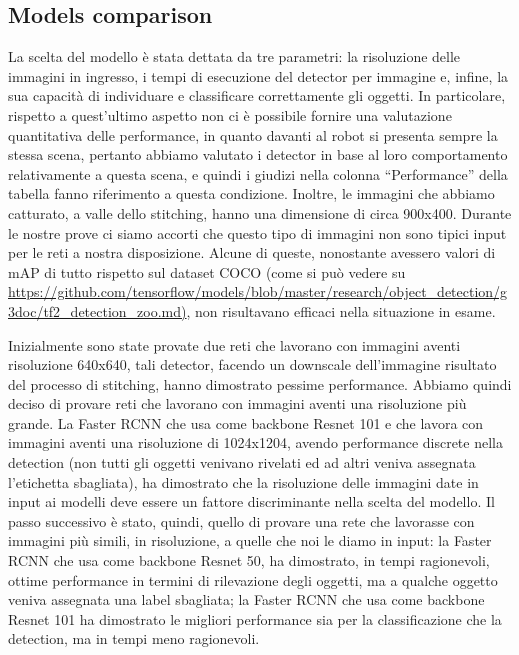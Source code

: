 \subsection{Models comparison}

La scelta del modello è stata dettata da tre parametri: la risoluzione delle immagini in ingresso, i tempi di esecuzione del detector per immagine e, infine, la sua capacità di individuare e classificare correttamente gli oggetti. In particolare, rispetto a quest’ultimo aspetto non ci è possibile fornire una valutazione quantitativa delle performance, in quanto davanti al robot si presenta sempre la stessa scena, pertanto abbiamo valutato i detector in base al loro comportamento relativamente a questa scena, e quindi i giudizi nella colonna “Performance” della tabella fanno riferimento a questa condizione. Inoltre, le immagini che abbiamo catturato, a valle dello stitching, hanno una dimensione di circa 900x400. Durante le nostre prove ci siamo accorti che questo tipo di immagini non sono tipici input per le reti a nostra disposizione. Alcune di queste, nonostante avessero valori di mAP di tutto rispetto sul dataset COCO (come si può vedere su \url{https://github.com/tensorflow/models/blob/master/research/object_detection/g3doc/tf2_detection_zoo.md)}, non risultavano efficaci nella situazione in esame.

Inizialmente sono state provate due reti che lavorano con immagini aventi risoluzione 640x640, tali detector, facendo un downscale dell’immagine risultato del processo di stitching, hanno dimostrato pessime performance.
Abbiamo quindi deciso di provare reti che lavorano con immagini aventi una risoluzione più grande. La Faster RCNN che usa come backbone Resnet 101 e che lavora con immagini aventi una risoluzione di 1024x1204, avendo performance discrete nella detection (non tutti gli oggetti venivano rivelati ed ad altri veniva assegnata l’etichetta sbagliata), ha dimostrato che la risoluzione delle immagini date in input ai modelli deve essere un fattore discriminante nella scelta del modello.
Il passo successivo è stato, quindi, quello di provare una rete che lavorasse con immagini più simili, in risoluzione, a quelle che noi le diamo in input: la Faster RCNN che usa come backbone Resnet 50, ha dimostrato, in tempi ragionevoli, ottime performance in termini di rilevazione degli oggetti, ma a qualche oggetto veniva assegnata una label sbagliata; la Faster RCNN che usa come backbone Resnet 101 ha dimostrato le migliori performance sia per la classificazione che la detection, ma in tempi meno ragionevoli.

